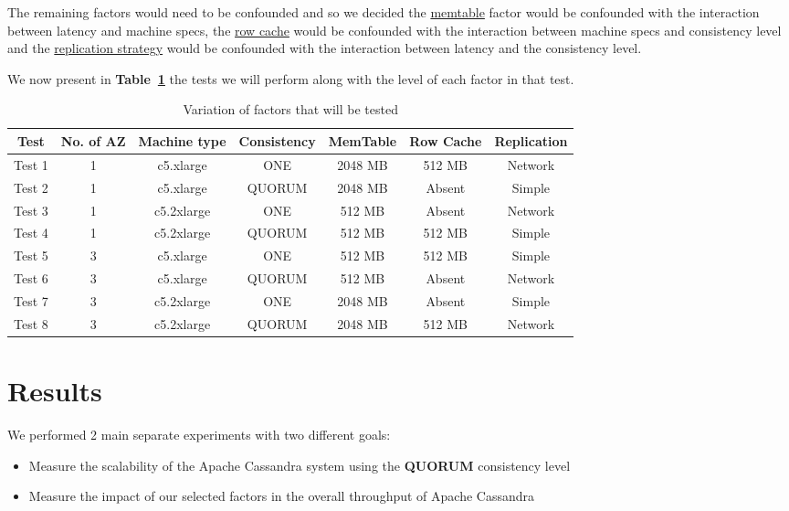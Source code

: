 \documentclass[runningheads]{llncs}
\begin{document}
The remaining factors would need to be confounded and so we decided the \underline{memtable} factor would be confounded with the interaction between latency and machine specs, the \underline{row cache} would be confounded with the interaction between machine specs and consistency level and the \underline{replication strategy} would be confounded with the interaction between latency and the consistency level.

We now present in \textbf{Table~\ref{Tab:tests}} the tests we will perform along with the level of each factor in that test.

\begin{table}
  \caption{Variation of factors that will be tested}
  \centering
  \begin{tabular} {|c|c|c|c|c|c|c|} 
    \hline
   Test & No. of AZ & Machine type & Consistency & MemTable & Row Cache & Replication \\
    \hline
   Test 1 & 1 & c5.xlarge & ONE & 2048 MB & 512 MB & Network \\ 
    \hline
   Test 2 & 1 & c5.xlarge  & QUORUM & 2048 MB & Absent & Simple \\
    \hline
   Test 3 & 1 & c5.2xlarge  & ONE & 512 MB & Absent & Network \\
    \hline
   Test 4 & 1 & c5.2xlarge  & QUORUM & 512 MB & 512 MB & Simple \\
    \hline
   Test 5 & 3 & c5.xlarge  & ONE & 512 MB & 512 MB & Simple \\
    \hline
   Test 6 & 3 & c5.xlarge  & QUORUM & 512 MB &  Absent & Network \\
    \hline
   Test 7 & 3 & c5.2xlarge  & ONE & 2048 MB &  Absent & Simple \\
    \hline
   Test 8 & 3 & c5.2xlarge  & QUORUM & 2048 MB & 512 MB & Network \\
    \hline
  \end{tabular}
  \label{Tab:tests}
\end{table}

\section{Results}

We performed 2 main separate experiments with two different goals:
\begin{itemize}
    \item Measure the scalability of the Apache Cassandra system using the \textbf{QUORUM} consistency level
    \item Measure the impact of our selected factors in the overall throughput of Apache Cassandra
\end{itemize}
\end{document}
